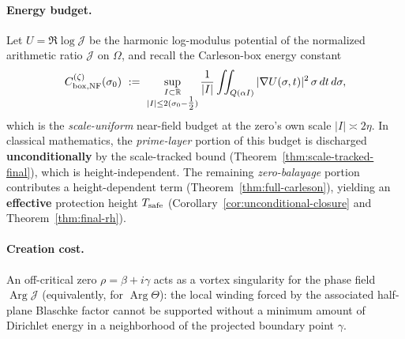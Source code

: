 \documentclass[11pt]{article}
\theoremstyle{definition}
\theoremstyle{remark}
\theoremstyle{definition}
\newcommand{\R}{\mathbb{R}}
\DeclareMathOperator{\Arg}{Arg}
\begin{document}
\paragraph{Energy budget.}
Let $U=\Re\log\mathcal J$ be the harmonic log-modulus potential of the normalized arithmetic ratio $\mathcal J$ on $\Omega$, and recall the Carleson-box energy constant
\[
  C_{{\rm box},{\rm NF}}^{(\zeta)}(\sigma_0)\ :=\ \sup_{\substack{I\subset\R\\ |I|\le 2(\sigma_0-\tfrac12)}} \frac{1}{|I|}\iint_{Q(\alpha I)} |\nabla U(\sigma,t)|^2\,\sigma\,dt\,d\sigma,
\]
which is the \emph{scale-uniform} near-field budget at the zero's own scale $|I|\asymp 2\eta$.
In classical mathematics, the \emph{prime-layer} portion of this budget is discharged \textbf{unconditionally} by the scale-tracked bound (Theorem~\ref{thm:scale-tracked-final}), which is height-independent. The remaining \emph{zero-balayage} portion contributes a height-dependent term (Theorem~\ref{thm:full-carleson}), yielding an \textbf{effective} protection height $T_{\rm safe}$ (Corollary~\ref{cor:unconditional-closure} and Theorem~\ref{thm:final-rh}).

\paragraph{Creation cost.}
An off-critical zero $\rho=\beta+i\gamma$ acts as a vortex singularity for the phase field $\Arg \mathcal J$ (equivalently, for $\Arg \Theta$): the local winding forced by the associated half-plane Blaschke factor cannot be supported without a minimum amount of Dirichlet energy in a neighborhood of the projected boundary point $\gamma$.
\end{document}
